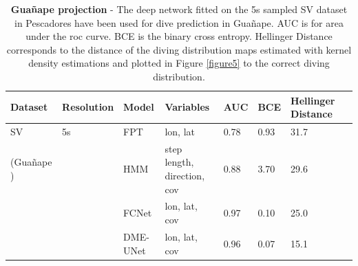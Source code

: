 \documentclass{article}
\begin{document}
\begin{table}[h]
 \caption{\textbf{Gua\~nape  projection} - The deep network fitted on the 5s sampled SV dataset in Pescadores have been used for dive prediction in Gua\~nape. AUC is for area under the roc curve. BCE is the binary cross entropy. Hellinger Distance corresponds to the distance of the diving distribution maps estimated with kernel density estimations and plotted in Figure \ref{figure5} to the correct diving distribution.}
  \centering
  \begin{tabular}{llllllll}
    \toprule
    Dataset  &  Resolution &  Model & Variables & AUC & BCE & Hellinger Distance \\
    \midrule
    SV      & 5s  & FPT    & lon, lat               & 0.78 & 0.93 & 31.7          \\
  (Gua\~nape ) &     & HMM    & step length, direction, cov & 0.88 & 3.70 & 29.6     \\
            &     & FCNet  & lon, lat, cov  & 0.97 & 0.10 & 25.0                  \\
            &     & DME-UNet   & lon, lat, cov  & 0.96 & 0.07 & 15.1              \\
    \bottomrule
  \end{tabular}
  \label{table3}
\end{table}
\end{document}
